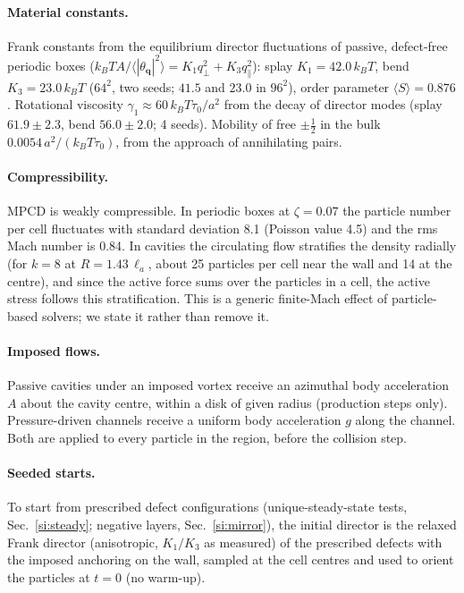 \documentclass[aps,prl,onecolumn,superscriptaddress,amsmath,amssymb,nofootinbib]{revtex4-2}
\newcommand{\half}{\tfrac12}
\newcommand{\la}{\ell_a}
\newcommand{\kT}{k_BT}
\begin{document}
\paragraph{Material constants.} Frank constants from the equilibrium director fluctuations of passive, defect-free periodic boxes
($\kT A/\langle|\theta_{\mathbf q}|^2\rangle=K_1q_\perp^2+K_3q_\parallel^2$): splay $K_1=42.0\,\kT$, bend $K_3=23.0\,\kT$ ($64^2$, two seeds; $41.5$ and $23.0$ in $96^2$),
order parameter $\langle S\rangle=0.876$. Rotational viscosity $\gamma_1\approx60\,\kT\tau_0/a^2$ from the decay of director modes (splay $61.9\pm2.3$, bend $56.0\pm2.0$;
4 seeds). Mobility of free $\pm\half$ in the bulk $0.0054\,a^2/(\kT\tau_0)$, from the approach of annihilating pairs.

\paragraph{Compressibility.} MPCD is weakly compressible. In periodic boxes at $\zeta=0.07$ the particle number per cell fluctuates with standard deviation 8.1
(Poisson value 4.5) and the rms Mach number is 0.84. In cavities the circulating flow stratifies the density radially (for $k=8$ at $R=1.43\,\la$, about 25
particles per cell near the wall and 14 at the centre), and since the active force sums over the particles in a cell, the active stress follows this
stratification. This is a generic finite-Mach effect of particle-based solvers; we state it rather than remove it.

\paragraph{Imposed flows.} Passive cavities under an imposed vortex receive an azimuthal body acceleration $A$ about the cavity centre, within a disk of given radius
(production steps only). Pressure-driven channels receive a uniform body acceleration $g$ along the channel. Both are applied to every particle in the region,
before the collision step.

\paragraph{Seeded starts.} To start from prescribed defect configurations (unique-steady-state tests, Sec.~\ref{si:steady}; negative layers, Sec.~\ref{si:mirror}),
the initial director is the relaxed Frank director (anisotropic, $K_1/K_3$ as measured) of the prescribed defects with the imposed anchoring on the wall, sampled
at the cell centres and used to orient the particles at $t=0$ (no warm-up).
\end{document}
